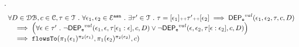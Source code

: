 %
\begin{lem}.
		\label{lem:inv_indepevents}
		\[
		\begin{array}{l}
			\forall D \in \dbdom , c \in \cdom, \trace \in \mathcal{T} \st \forall \event_1, \event_2 \in \eventset^{\asn} \st
			 \exists \trace' \in \mathcal{T} \st \trace = [\event_1] \tracecat \trace' \tracecat [\event_2]
			\implies
			\eventdep^{val}(\event_1, \event_2, \trace, c, D) 
			\\ \quad 
			\implies 
			\left( \forall \event \in \trace' \st \neg \eventdep^{val}(\event_1, \event, \trace[\event_1:\event], c, D)
			\lor \neg \eventdep^{val}(\event, \event_2, \trace[\event:\event_2], c, D) 
			\right) 
			\\ \quad 
			\implies 
			\flowsto(\pi_1(\event_1)^{\pi_2(\event_1)}, \pi_1(\event_2)^{\pi_2(\event_2)}, c)
		\end{array}
		\]
\end{lem}
%
